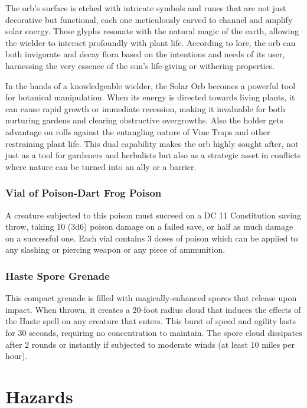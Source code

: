 The orb's surface is etched with intricate symbols and runes that are not just decorative but functional, each one meticulously carved to channel and amplify solar energy. These glyphs resonate with the natural magic of the earth, allowing the wielder to interact profoundly with plant life. According to lore, the orb can both invigorate and decay flora based on the intentions and needs of its user, harnessing the very essence of the sun's life-giving or withering properties.

In the hands of a knowledgeable wielder, the Solar Orb becomes a powerful tool for botanical manipulation. When its energy is directed towards living plants, it can cause rapid growth or immediate recession, making it invaluable for both nurturing gardens and clearing obstructive overgrowths. Also the holder gets advantage on rolls against the entangling nature of Vine Traps and other restraining plant life. This dual capability makes the orb highly sought after, not just as a tool for gardeners and herbalists but also as a strategic asset in conflicts where nature can be turned into an ally or a barrier.

\subsection*{Vial of Poison-Dart Frog Poison}
\label{sec:VialOfPoison-DartFrogPoison}
A creature subjected to this poison must succeed on a DC 11 Constitution saving throw, taking 10 (3d6) poison damage on a failed save, or half as much damage on a successful one. Each vial contains 3 doses of poison which can be applied to any slashing or piercing weapon or any piece of ammunition.

\subsection*{Haste Spore Grenade}
\label{sec:HasteSporeGrenade}
This compact grenade is filled with magically-enhanced spores that release upon impact. When thrown, it creates a 20-foot radius cloud that induces the effects of the Haste spell on any creature that enters. This burst of speed and agility lasts for 30 seconds, requiring no concentration to maintain. The spore cloud dissipates after 2 rounds or instantly if subjected to moderate winds (at least 10 miles per hour). 


\chapter{Hazards}
